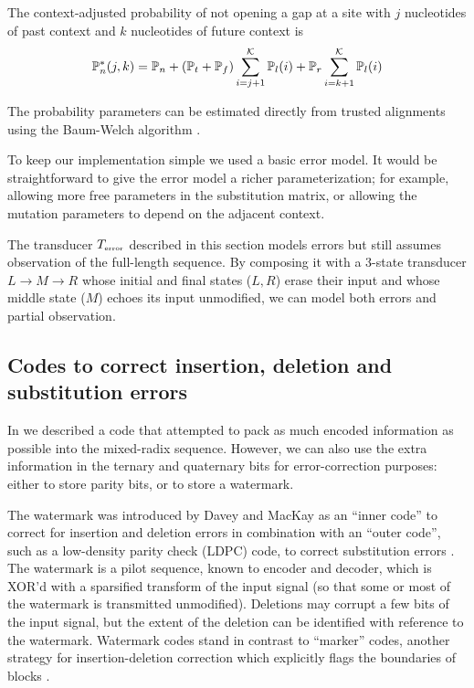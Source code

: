\documentclass[english]{article}
\begin{document}
The context-adjusted probability of not opening a gap at a site with $j$ nucleotides of past context and $k$ nucleotides of future context is
\[
\mathbb{P}_{n}^\ast(j,k) = \mathbb{P}_{n} + (\mathbb{P}_{t} + \mathbb{P}_{f}) \sum_{i=j+1}^{{\cal K}} \mathbb{P}_{l}(i) + \mathbb{P}_{r} \sum_{i=k+1}^{{\cal K}} \mathbb{P}_{l}(i)
\]

The probability parameters can be estimated directly from trusted alignments using the Baum-Welch algorithm \cite{Durbin98}.

To keep our implementation simple we used a basic error model.
It would be straightforward to give the error model a richer parameterization;
for example, allowing more free parameters in the substitution matrix,
or allowing the mutation parameters to depend on the adjacent context.

The transducer $T_{\mbox{\tiny error}}$
described in this section models errors but still assumes observation of the full-length sequence.
By composing it with a 3-state transducer $L \to M \to R$ whose initial and final states ($L,R$) erase their input
and whose middle state ($M$) echoes its input unmodified,
we can model both errors and partial observation.

\subsection{Codes to correct insertion, deletion and substitution errors}

In  we described a code that attempted to pack as much encoded information as possible into the mixed-radix sequence.
However, we can also use the extra information in the ternary and quaternary bits for error-correction purposes:
either to store parity bits, or to store a watermark.

The watermark was introduced by Davey and MacKay as an ``inner code'' to correct for insertion and deletion errors
in combination with an ``outer code'', such as a low-density parity check (LDPC) code, to correct substitution errors \cite{DaveyMackay2000,DaveyMackay2001}.
The watermark is a pilot sequence, known to encoder and decoder, which is XOR'd with a sparsified transform of the input signal
(so that some or most of the watermark is transmitted unmodified).
Deletions may corrupt a few bits of the input signal, but the extent of the deletion can be identified with reference to the watermark.
Watermark codes stand in contrast to ``marker'' codes, another strategy for insertion-deletion correction which explicitly flags the boundaries of blocks \cite{RatzerMackay2000}.
\end{document}
